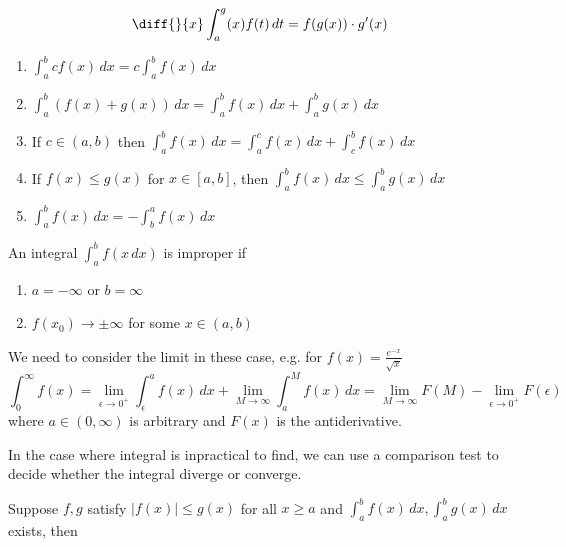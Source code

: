 \documentclass[11pt]{article}
\begin{document}
\begin{corollary}
  \[\diff{}{x}\int_a^g(x)f(t)\,dt=f(g(x))\cdot g'(x)\]
\end{corollary}

\begin{proposition}
  \begin{enumerate}
    \item \(\int_a^b cf(x)\,dx=c\int_a^b f(x)\,dx\)
    \item \(\int_a^b (f(x)+g(x))\,dx=\int_a^b f(x)\,dx + \int_a^b g(x)\,dx\)
    \item If \(c\in (a,b)\) then \(\int_a^b f(x)\,dx=\int_a^c f(x)\,dx + \int_c^b f(x)\,dx\)
    \item If \(f(x)\leq g(x)\) for \(x\in [a,b]\), then \(\int_a^b f(x)\,dx \leq \int_a^b g(x)\,dx\)
    \item \(\int_a^b f(x)\,dx=-\int_b^a f(x)\,dx\)
  \end{enumerate}
\end{proposition}

\begin{definition}
  An integral \(\int_a^bf(x\,dx)\) is improper if
  \begin{enumerate}
    \item \(a=-\infty\) or \(b=\infty\)
    \item \(f(x_0)\to \pm\infty\) for some \(x\in(a,b)\)
  \end{enumerate} 
\end{definition}

We need to consider the limit in these case, e.g. for \(f(x)=\frac{e^{-x}}{\sqrt{x}}\)
\begin{equation}
  \label{eq:1}
  \int_0^\infty f(x)=\lim_{\epsilon\to 0^+}\int_\epsilon^a f(x)\,dx+\lim_{M\to\infty}\int_a^M f(x)\,dx=\lim_{M\to\infty}F(M)-\lim_{\epsilon\to 0^+}F(\epsilon)
\end{equation} 
where \(a\in (0,\infty)\) is arbitrary and \(F(x)\) is the antiderivative.

In the case where integral is inpractical to find, we can use a comparison test to decide whether the integral diverge or converge.
\begin{proposition}
  Suppose \(f,g\) satisfy \(|f(x)|\leq g(x)\) for all \(x\geq a\) and \(\int_a^b f(x)\,dx, \int_a^b g(x)\,dx \) exists, then
\end{proposition}
\end{document}

